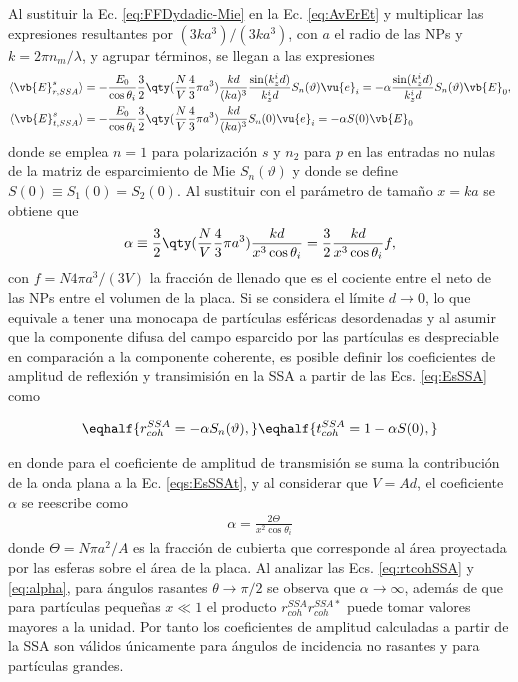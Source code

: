 Al sustituir la Ec. \eqref{eq:FFDydadic-Mie} en la Ec. \eqref{eq:AvErEt} y multiplicar las expresiones resultantes por $(3ka^3)/(3ka^3)$, con $a$ el radio de las NPs y $k = 2\pi n_m /\lambda$, y agrupar términos, se llegan a las expresiones 
	\begin{subequations}\begin{align}
		\langle \vb{E}^s_{r,SSA}\rangle & = - \frac{E_0}{\cos\theta_i} \frac32  \qty(\frac{N}{V} \frac43\pi a^3)\frac{kd}{(ka)^3}   \frac{\sin(k_z^id)}{k_z^i d}  S_n(\vartheta)\vu{e}_i =
		-\alpha  \frac{\sin(k_z^id)}{k_z^i d}   S_n(\vartheta) \vb{E}_0,
		\label{eqs:EsSSAr}\\
	\langle \vb{E}^s_{t,SSA}\rangle &=  - \frac{E_0}{\cos\theta_i} \frac32
						 \qty(\frac{N}{V}\frac43\pi a^3  ) \frac{kd}{(ka)^3}  S_n(0) \vu{e}_i  
						 = - \alpha S(0) \vb{E}_0
		\label{eqs:EsSSAt}
	\end{align}\label{eq:EsSSA}\end{subequations}
donde  se emplea $n=1$ para polarización $s$ y $n_2$ para $p$ en las entradas no nulas de la matriz de esparcimiento de Mie $S_n(\vartheta)$ y donde se define $S(0) \equiv S_1(0)=S_2(0)$. Al sustituir con el parámetro de tamaño $x=ka$ se obtiene que  
\begin{align*}
	\alpha \equiv \frac32 \qty(\frac{N}{V}\frac43 \pi a^3  )\frac{kd}{x^3\cos\theta_i} = \frac32\frac{kd}{ x^3\cos\theta_i} f,
	\end{align*}
con $f= N 4\pi a^3/(3V)$ la fracción de llenado que es el cociente entre el neto de las NPs entre el volumen de la placa. Si se considera el límite $d\to 0$, lo que equivale a tener una monocapa de partículas esféricas desordenadas y al asumir que la componente difusa del campo esparcido por las partículas es despreciable en comparación a la componente coherente, es posible definir los coeficientes de amplitud de reflexión y transimisión en la SSA a partir de las Ecs. \eqref{eq:EsSSA} como \vspace*{-.75em}	
	
	\begin{subequations}\eqhalf{r_{coh}^{SSA} = -\alpha S_n(\vartheta),}
	\eqhalf{t_{coh}^{SSA} = 1 - \alpha S(0), }
	\label{eq:rtcohSSA}\end{subequations}\vspace*{-.75em}	
	
\noindent en donde para el coeficiente de amplitud de transmisión se suma la contribución de la onda plana a la Ec. \eqref{eqs:EsSSAt}, y al considerar que $V = A d$, el coeficiente $\alpha$ se reescribe como
	\begin{align}
	\alpha = \frac{2\Theta}{x^2 \cos\theta_i}
	\label{eq:alpha}
	\end{align}
donde $\Theta = N \pi a^2 / A$ es la fracción de cubierta que corresponde al área proyectada por las esferas sobre el área de la placa. Al analizar  las Ecs. \eqref{eq:rtcohSSA} y \eqref{eq:alpha}, para ángulos rasantes $\theta\to \pi/2$ se observa que $\alpha\to \infty$, además de que para partículas pequeñas $x\ll 1$ el producto $r_{coh}^{SSA}r_{coh}^{SSA*}$ puede tomar valores mayores a la unidad. Por tanto los coeficientes de amplitud calculadas a partir de la SSA son válidos únicamente para ángulos de incidencia no rasantes y para partículas grandes. 

